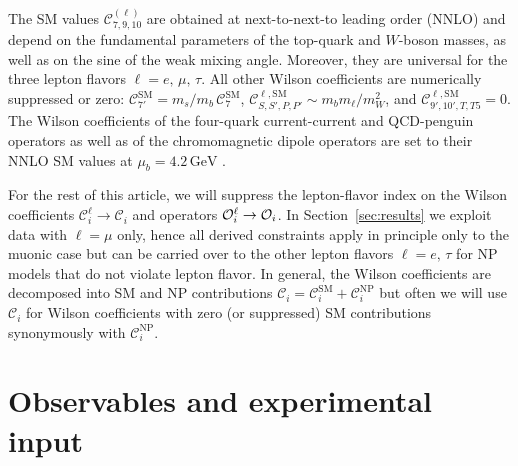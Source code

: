 \documentclass[twocolumn,epjc3]{svjour3}
\numberwithin{equation}{section}
\def \refsec#1{Section~\ref{#1}}
\newcommand{\checked}[1]{{\color{brown}{ {\bf Checked: }{#1}}}}
\renewcommand{\checked}[1]{#1}
\newcommand{\wilson}[2][{}]{\mathcal{C}_{#2}^{\mathrm{#1}}}
\renewcommand{\[}{\big[}
\renewcommand{\]}{\big]}
\renewcommand{\(}{\big(}
\renewcommand{\)}{\big)}
\def \Op{{\cal O}}
\begin{document}
The SM values $\wilson[(\ell)]{7,9,10}$ are obtained at
next-to-next-to leading order (NNLO) \cite{Bobeth:2003at,
  Huber:2005ig} and depend on the fundamental parameters of the
top-quark and $W$-boson masses, as well as on the sine of the weak
mixing angle.  Moreover, they are universal for the three lepton
flavors $\ell = e,\, \mu,\, \tau$.  All other Wilson coefficients are
numerically suppressed or zero: $\wilson[SM]{7'} = m_s/m_b\,
\wilson[SM]{7}$, $\wilson[\ell, SM]{S,S',P,P'} \sim {m_b
  m_\ell/m_W^2}$, and $\wilson[\ell, SM]{9',10',T,T5} = 0$.  The
Wilson coefficients of the four-quark current-current and QCD-penguin
operators as well as of the chromomagnetic dipole operators are set to
their NNLO SM values at $\mu_b = 4.2 \, \mbox{GeV}$
\cite{Bobeth:2003at, Huber:2005ig}.

For the rest of this article, we will suppress the lepton-flavor index
on the Wilson coefficients $\wilson[\ell]{i} \to \wilson[]{i}$ and
operators $\Op_i^\ell \to \Op_i$. In \refsec{sec:results} we exploit
data with $\ell =\mu$ only, hence all derived constraints apply in
principle only to the muonic case but can be carried over to the other
lepton flavors $\ell = e,\, \tau$ for NP models that do not violate
lepton flavor. In general, the Wilson coefficients are decomposed into
SM and NP contributions $\wilson[]{i} = \wilson[SM]{i} +
\wilson[NP]{i}$ but often we will use $\wilson[]{i}$ for Wilson
coefficients with zero (or suppressed) SM contributions synonymously
with $\wilson[NP]{i}$.

%
%
%
\section{
  \checked{Observables and experimental input}
  \label{sec:observables}
}
\end{document}
